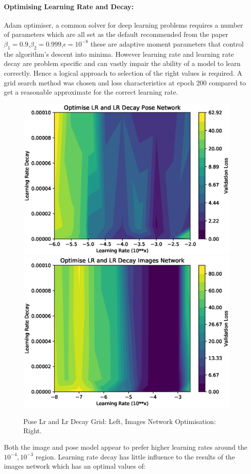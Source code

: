 \documentclass[11pt,twoside]{report}
\begin{document}
\paragraph{Optimising Learning Rate and Decay:}
Adam optimiser, a common solver for deep learning problems requires a number of parameters which are all set as the default recommended from the paper \cite{DBLP:journals/corr/KingmaB14} $\beta_{1}=0.9$,$\beta_{2}=0.999$,$\epsilon=10^{-8}$ these are adaptive moment parameters that control the algorithm's descent into minima. However learning rate and learning rate decay are problem specific and can vastly impair the ability of a model to learn correctly. Hence a logical approach to selection of the right values is required. A grid search method was chosen and loss characteristics at epoch 200 compared to get a reasonable approximate for the correct learning rate.


\noindent \begin{figure}[h!]
	\includegraphics[width = 0.5\hsize]{figures/pose_lr_lr_decay_graph_.eps}
	\includegraphics[width = 0.5\hsize]{figures/images_lr_lr_decay_graph_.eps}
	\caption{Pose Lr and Lr Decay Grid: Left, Images Network Optimisation: Right.}
	\label{lr_and_decay_grid}
\end{figure}

Both the image and pose model appear to prefer higher learning rates around the $10^{-4},10^{-3}$ region. Learning rate decay has little influence to the results of the images network which has an optimal values of:
\end{document}

